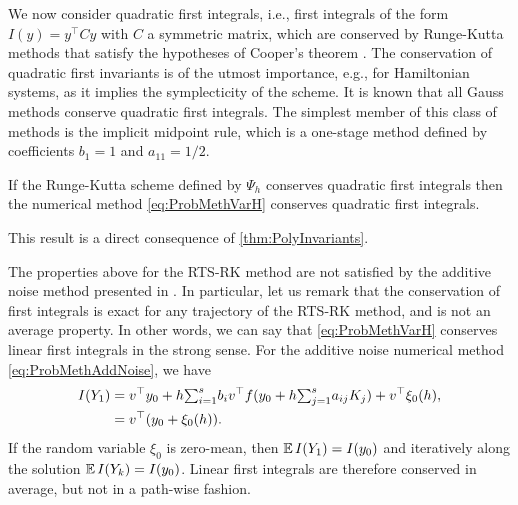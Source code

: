 \documentclass[10pt]{article}
\begin{document}
We now consider quadratic first integrals, i.e., first integrals of the form $I(y) = y^\top C y$ with $C$ a symmetric matrix, which are conserved by Runge-Kutta methods that satisfy the hypotheses of Cooper's theorem \cite{HLW06}. The conservation of quadratic first invariants is of the utmost importance, e.g., for Hamiltonian systems, as it implies the symplecticity of the scheme. It is known \cite{HLW06} that all Gauss methods conserve quadratic first integrals. The simplest member of this class of methods is the implicit midpoint rule, which is a one-stage method defined by coefficients $b_1 = 1$ and $a_{11} = 1/2$.
\begin{corollary}\label{thm:QuadraticInvariants} If the Runge-Kutta scheme defined by $\Psi_h$ conserves quadratic first integrals then the numerical method \eqref{eq:ProbMethVarH} conserves quadratic first integrals.
\end{corollary}
This result is a direct consequence of \cref{thm:PolyInvariants}.

The properties above for the RTS-RK method are not satisfied by the additive noise method presented in \cite{CGS16}. In particular, let us remark that the conservation of first integrals is exact for any trajectory of the RTS-RK method, and is not an average property. In other words, we can say that \eqref{eq:ProbMethVarH} conserves linear first integrals in the strong sense. For the additive noise numerical method \eqref{eq:ProbMethAddNoise}, we have
\begin{equation}
	\begin{aligned}
	I(Y_1) &= v^\top  y_0 + h {\textstyle\sum}_{i=1}^s b_iv^\top  f(y_0 + h{\textstyle\sum}_{j=1}^{s} a_{ij}K_j) + v^\top  \xi_0(h), \\
	&= v^\top  (y_0 + \xi_0(h)).
	\end{aligned}
\end{equation}
If the random variable $\xi_0$ is zero-mean, then $\operatorname{\mathbb{E}} I(Y_1) = I(y_0)$ and iteratively along the solution $\operatorname{\mathbb{E}} I(Y_k) = I(y_0)$. Linear first integrals are therefore conserved in average, but not in a path-wise fashion.
\end{document}
